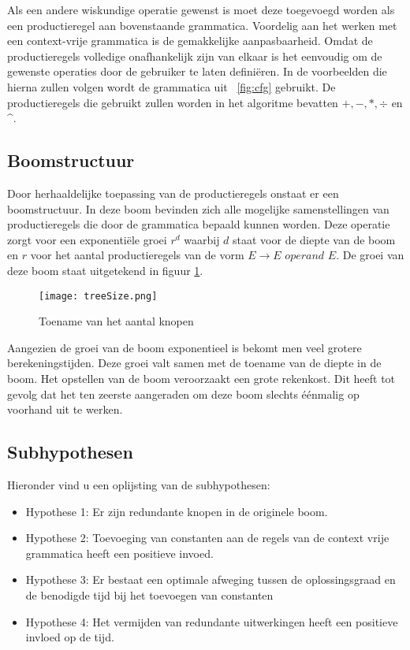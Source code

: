 \documentclass[Main.tex]{subfiles}
\begin{document}
Als een andere wiskundige operatie gewenst is moet deze toegevoegd worden als een productieregel aan bovenstaande grammatica. Voordelig aan het werken met een context-vrije grammatica is de gemakkelijke aanpasbaarheid. Omdat de productieregels volledige onafhankelijk zijn van elkaar is het eenvoudig om de gewenste operaties door de gebruiker te laten defini\"eren. In de voorbeelden die hierna zullen volgen wordt de grammatica uit ~\ref{fig:cfg} gebruikt. De productieregels die gebruikt zullen worden in het algoritme bevatten $+, -, \ast, \div$ en \^{}.

\subsection{Boomstructuur}

Door herhaaldelijke toepassing van de productieregels onstaat er een boomstructuur. In deze boom bevinden zich alle mogelijke samenstellingen van productieregels die door de grammatica bepaald kunnen worden. Deze operatie zorgt voor een exponenti\"ele groei $r^{d}$ waarbij $d$ staat voor de diepte van de boom en $r$ voor het aantal productieregels van de vorm $E \rightarrow E$  $operand$ $ E$. De groei van deze boom staat uitgetekend in figuur \ref{fig:treeSize}.

\begin{figure}[!htb]
\centering
\texttt{[image: treeSize.png]}
\caption{Toename van het aantal knopen}
\label{fig:treeSize}
\end{figure}

Aangezien de groei van de boom exponentieel is bekomt men veel grotere berekeningstijden. Deze groei valt samen met de toename van de diepte in de boom. Het opstellen van de boom veroorzaakt een grote rekenkost. Dit heeft tot gevolg dat het ten zeerste aangeraden om deze boom slechts \'e\'enmalig op voorhand uit te werken.

\subsection{Subhypothesen} \label{ssec:subhypothesen}
\par Hieronder vind u een oplijsting van de subhypothesen:

\begin{itemize}
\item Hypothese 1: Er zijn redundante knopen in de originele boom.
\item Hypothese 2: Toevoeging van constanten aan de regels van de context vrije grammatica heeft een positieve invoed.
\item Hypothese 3: Er bestaat een optimale afweging tussen de oplossingsgraad en de benodigde tijd bij het toevoegen van constanten
\item Hypothese 4: Het vermijden van redundante uitwerkingen heeft een positieve invloed op de tijd. 
\end{itemize}
\end{document}
